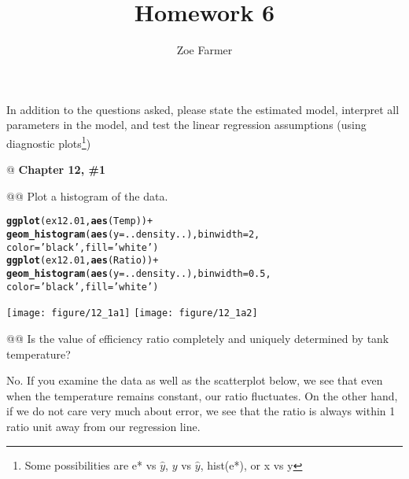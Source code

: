\documentclass[10pt]{article}\usepackage[]{graphicx}\usepackage[]{xcolor}
\title{Homework 6}
\author{Zoe Farmer}
\makeatletter
\newcommand{\hlnum}[1]{\textcolor[rgb]{0.686,0.059,0.569}{#1}}%
\newcommand{\hlstr}[1]{\textcolor[rgb]{0.192,0.494,0.8}{#1}}%
\newcommand{\hlopt}[1]{\textcolor[rgb]{0,0,0}{#1}}%
\newcommand{\hlstd}[1]{\textcolor[rgb]{0.345,0.345,0.345}{#1}}%
\newcommand{\hlkwc}[1]{\textcolor[rgb]{0.333,0.667,0.333}{#1}}%
\newcommand{\hlkwd}[1]{\textcolor[rgb]{0.737,0.353,0.396}{\textbf{#1}}}%
\newenvironment{kframe}{%
 \def\at@end@of@kframe{}%
 \ifinner\ifhmode%
  \def\at@end@of@kframe{\end{minipage}}%
  \begin{minipage}{\columnwidth}%
 \fi\fi%
 \def\FrameCommand##1{\hskip\@totalleftmargin \hskip-\fboxsep
 \colorbox{shadecolor}{##1}\hskip-\fboxsep
     \hskip-\linewidth \hskip-\@totalleftmargin \hskip\columnwidth}%
 \MakeFramed {\advance\hsize-\width
   \@totalleftmargin\z@ \linewidth\hsize
   \@setminipage}}%
 {\par\unskip\endMakeFramed%
 \at@end@of@kframe}
\newenvironment{knitrout}{}{} %
\makeatother
\begin{document}
\maketitle




In addition to the questions asked, please state the estimated model, interpret all parameters in the model, and test
the linear regression assumptions (using diagnostic plots\footnote{Some possibilities are e* vs $\hat{y}$, $y$ vs
$\hat{y}$, hist(e*), or x vs y})

\begin{easylist}[enumerate]
    @ \textbf{Chapter 12, \#1}  %

    @@ Plot a histogram of the data.

\begin{knitrout}
\color{fgcolor}\begin{kframe}
\begin{alltt}
         \hlkwd{ggplot}\hlstd{(ex12.01,} \hlkwd{aes}\hlstd{(Temp))} \hlopt{+}
             \hlkwd{geom_histogram}\hlstd{(}\hlkwd{aes}\hlstd{(}\hlkwc{y}\hlstd{=..density..),} \hlkwc{binwidth}\hlstd{=}\hlnum{2}\hlstd{,}
                            \hlkwc{color}\hlstd{=}\hlstr{'black'}\hlstd{,} \hlkwc{fill}\hlstd{=}\hlstr{'white'}\hlstd{)}
         \hlkwd{ggplot}\hlstd{(ex12.01,} \hlkwd{aes}\hlstd{(Ratio))} \hlopt{+}
             \hlkwd{geom_histogram}\hlstd{(}\hlkwd{aes}\hlstd{(}\hlkwc{y}\hlstd{=..density..),} \hlkwc{binwidth}\hlstd{=}\hlnum{0.5}\hlstd{,}
                            \hlkwc{color}\hlstd{=}\hlstr{'black'}\hlstd{,} \hlkwc{fill}\hlstd{=}\hlstr{'white'}\hlstd{)}
\end{alltt}
\end{kframe}

{\centering \texttt{[image: figure/12\_1a1]} 
\texttt{[image: figure/12\_1a2]} 

}



\end{knitrout}


    @@ Is the value of efficiency ratio completely and uniquely determined by tank temperature?\newline

    No. If you examine the data as well as the scatterplot below, we see that even when the temperature remains
    constant, our ratio fluctuates. On the other hand, if we do not care very much about error, we see that the ratio is
    always within 1 ratio unit away from our regression line.


\end{easylist}
\end{document}
